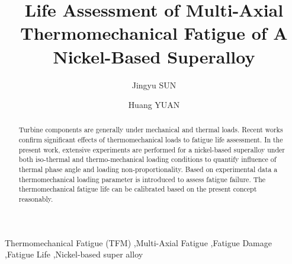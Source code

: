\documentclass[preprint,5p,twocolumn,11pt,sort&compress]{elsarticle}
\begin{document}



\begin{frontmatter}



\title{Life Assessment of Multi-Axial Thermomechanical Fatigue of A Nickel-Based Superalloy}


\author{Jingyu SUN}
\author{Huang YUAN}

\address[label1]{School of Aerospace Engineering, Tsinghua University, Beijing, China}
\address[label2]{Department of Civil Engineering, Technical University of Darmstadt, Germany}

\begin{abstract}

Turbine components are generally under mechanical and thermal loads. Recent works confirm significant effects of thermomechanical loads to fatigue life assessment. In the present work, extensive experiments are performed for a nickel-based superalloy under both iso-thermal and thermo-mechanical loading conditions to quantify influence of thermal phase angle and loading non-proportionality. Based on experimental data a thermomechanical loading parameter is introduced to assess fatigue failure. The thermomechanical fatigue life can be calibrated based on the present concept reasonably.
\end{abstract}

%
\begin{keyword}
Thermomechanical Fatigue (TFM) \sep Multi-Axial Fatigue \sep Fatigue Damage \sep Fatigue Life \sep Nickel-based super alloy

\end{keyword}
\end{frontmatter}
\end{document}
